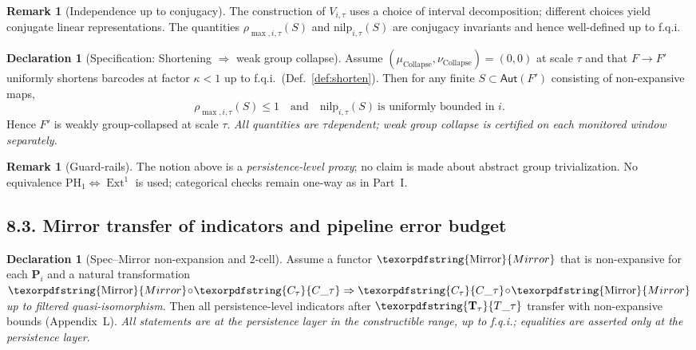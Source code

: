 \documentclass[11pt]{article}
\DeclareMathOperator{\Ext}{Ext}
\DeclareRobustCommand{\hyp}{\nobreakdash-}
\numberwithin{equation}{section}
\theoremstyle{definition}
\newtheorem{remark}[theorem]{Remark}
\newtheorem{declaration}[theorem]{Declaration}
\DeclareRobustCommand{\Ttau}{\texorpdfstring{\ensuremath{\mathbf{T}_{\tau}}}{T\_\tau}}
\DeclareRobustCommand{\Ctau}{\texorpdfstring{\ensuremath{C_{\tau}}}{C\_\tau}}
\DeclareRobustCommand{\Mirror}{\texorpdfstring{\ensuremath{\operatorname{Mirror}}}{Mirror}}
\begin{document}
\begin{remark}[Independence up to conjugacy]\label{rk:conj-inv}
The construction of \(V_{i,\tau}\) uses a choice of interval decomposition; different choices yield conjugate linear representations.
The quantities \(\rho_{\max,i,\tau}(S)\) and \(\mathrm{nilp}_{i,\tau}(S)\) are conjugacy invariants and hence well\hyp defined up to f.q.i.
\end{remark}

\begin{declaration}[Specification: Shortening \(\Rightarrow\) weak group collapse]\label{spec:short-to-weak}
Assume \((\mu_{\mathrm{Collapse}},\nu_{\mathrm{Collapse}})=(0,0)\) at scale \(\tau\) and that \(F\to F'\) uniformly shortens barcodes at factor \(\kappa<1\) up to f.q.i.\ (Def.~\ref{def:shorten}).
Then for any finite \(S\subset \mathsf{Aut}(F')\) consisting of non\hyp expansive maps,
\[
  \rho_{\max,i,\tau}(S)\le 1\quad \text{and}\quad \mathrm{nilp}_{i,\tau}(S)\ \text{is uniformly bounded in \(i\)}.
\]
Hence \(F'\) is weakly group\hyp collapsed at scale \(\tau\).
\emph{All quantities are \(\tau\)\nobreakdash dependent; weak group collapse is certified on each monitored window separately.}
\end{declaration}

\begin{remark}[Guard\hyp rails]\label{rk:guard}
The notion above is a \emph{persistence\hyp level proxy}; no claim is made about abstract group trivialization.
No equivalence \(\mathrm{PH}_1\Leftrightarrow\Ext^1\) is used; categorical checks remain one\hyp way as in Part~I.
\end{remark}

\subsection*{8.3. Mirror transfer of indicators and pipeline error budget}
\begin{declaration}[Spec–Mirror non\hyp expansion and $2$-cell]\label{spec:mirror}
Assume a functor \(\Mirror\) that is non\hyp expansive for each \(\mathbf{P}_i\) and a natural transformation \(\Mirror\!\circ\! \Ctau \Rightarrow \Ctau\!\circ\!\Mirror\) \emph{up to filtered quasi\hyp isomorphism}.
Then all persistence\hyp level indicators after \(\Ttau\) transfer with non\hyp expansive bounds (Appendix~L).
\emph{All statements are at the persistence layer in the constructible range, up to f.q.i.; equalities are asserted only at the persistence layer.}
\end{declaration}
\end{document}
